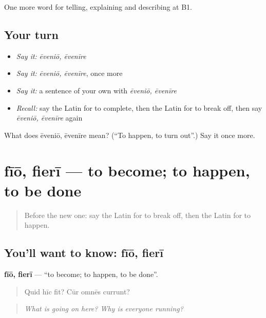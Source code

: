 \begin{grammarlens}[title={What you've built}]
One more word for telling, explaining and describing at B1.
\end{grammarlens}

\subsection*{Your turn}
\begin{itemize}
\raggedright
  \item \emph{Say it:} \emph{ēveniō, ēvenīre}
  \item \emph{Say it:} \emph{ēveniō, ēvenīre}, once more
  \item \emph{Say it:} a sentence of your own with \emph{ēveniō, ēvenīre}
  \item \emph{Recall:} say the Latin for to complete, then the Latin for to break off, then say \emph{ēveniō, ēvenīre} again
\end{itemize}

\begin{tcolorbox}[breakable,colback=teal!4,colframe=teal!35!black,title={Before you move on}]
What does ēveniō, ēvenīre mean? (\textquotedblleft{}To happen, to turn out\textquotedblright{}.) Say it once more.
\end{tcolorbox}
\section[fīō, fierī]{fīō, fierī — to become; to happen, to be done}

\label{lesson:LA-C298-fio}



\begin{quote}
Before the new one: say the Latin for to break off, then the Latin for to happen.
\end{quote}

\subsection*{You'll want to know: fīō, fierī}
\textbf{fīō, fierī} — \textquotedblleft{}to become; to happen, to be done\textquotedblright{}.

\begin{quote}
Quid hīc fit? Cūr omnēs currunt?
\end{quote}

\begin{quote}
\emph{What is going on here? Why is everyone running?}
\end{quote}

